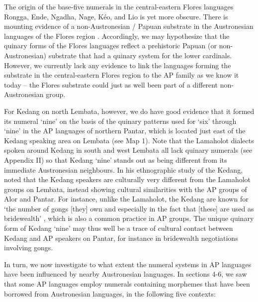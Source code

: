 The origin of the base-five numerals in the central-eastern Flores languages Rongga, Ende, Ngadha, Nage, K\'eo, and Lio is yet more obscure. There is mounting evidence of a non-Austronesian / Papuan substrate in the Austronesian languages of the Flores region \citep[see, e.g.,][]{Capell1976,Klamer2012}. Accordingly, we may hypothesize that the quinary forms of the Flores languages reflect a prehistoric Papuan (or non-Austronesian) substrate that had a quinary system for the lower cardinals. However, we currently lack any evidence to link the languages forming the substrate in the central-eastern Flores region to the AP family as we know it today -- the Flores substrate could just as well been part of a different non-Austronesian group. 

For Kedang on north Lembata, however, we do have good evidence that it formed its numeral `nine' on the basis of the quinary patterns used for `six' through `nine' in the AP languages of northern Pantar, which is located just east of the Kedang speaking area on Lembata (see Map 1). Note that the Lamaholot dialects spoken around Kedang in south and west Lembata all lack quinary numerals (see Appendix II) so that Kedang `nine' stands out as being different from its immediate Austronesian neighbours. In his ethnographic study of the Kedang, \citet{Barnes1974} noted that the Kedang speakers are culturally very different from the Lamaholot groups on Lembata, instead showing cultural similarities with the AP groups of Alor and Pantar. For instance, unlike the Lamaholot, the Kedang are known for `the number of gongs [they] own and especially in the fact that [these] are used as bridewealth' \citep[15]{Barnes1974}, which is also a common practice in AP groups. The unique quinary form of Kedang `nine' may thus well be a trace of cultural contact between Kedang and AP speakers on Pantar, for instance in bridewealth negotiations involving gongs.{} 

In turn, we now investigate to what extent the numeral systems in AP languages have been influenced by nearby Austronesian languages. In sections 4-6, we saw that some AP languages employ numerals containing morphemes that have been borrowed from Austronesian languages, in the following five contexts: 


